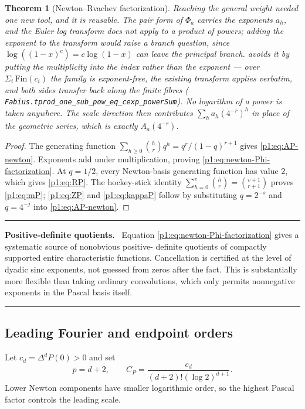 \documentclass[11pt,oneside]{article}
\numberwithin{equation}{section}
\newtheorem{theorem}{Theorem}[section]
\theoremstyle{definition}
\theoremstyle{remark}
\newcommand{\lean}[1]{%
  \ifmmode\text{\texttt{\detokenize{#1}}}\else\nolinkurl{#1}\fi}
\newenvironment{resultbox}[1]{%
  \par\medskip\noindent\begin{center}\begin{minipage}{0.94\textwidth}%
  \color{deepgreen}\hrule\vspace{0.65em}%
  \color{black}\textbf{\color{deepgreen}#1.}\ }{%
  \par\vspace{0.65em}\color{deepgreen}\hrule
  \end{minipage}\end{center}\medskip}
\begin{document}
\begin{theorem}[Newton--Rvachev factorization]
Reaching the general weight needed one new tool, and it is reusable.  The pair form of $\Phi_a$
carries the exponents $a_h$, and the Euler log transform does not apply to a product of powers;
adding the exponent to the transform would raise a branch question, since
$\log((1-x)^c)=c\log(1-x)$ can leave the principal branch.  
avoids it by putting the multiplicity into the \emph{index} rather than the exponent --- over
$\Sigma_i\,\mathrm{Fin}(c_i)$ the family is exponent-free, the existing transform applies
verbatim, and both sides transfer back along the finite fibres
(\lean{Fabius.tprod\_one\_sub\_pow\_eq\_cexp\_powerSum}).  No logarithm of a power is taken
anywhere.  The scale direction then contributes $\sum_h a_h(4^{-r})^h$ in place of the geometric
series, which is exactly $A_a(4^{-r})$.
\end{theorem}

\begin{proof}
The generating function
$\sum_{h\ge0}\binom hrq^h=q^r/(1-q)^{r+1}$ gives
\eqref{p1:eq:AP-newton}.  Exponents add under multiplication, proving
\eqref{p1:eq:newton-Phi-factorization}.  At $q=1/2$, every Newton-basis generating function
has value $2$, which gives \eqref{p1:eq:RP}.  The hockey-stick identity
$\sum_{h=0}^{v}\binom hr=\binom{v+1}{r+1}$ proves \eqref{p1:eq:mP};
\eqref{p1:eq:ZP} and \eqref{p1:eq:kappaP} follow by substituting $q=2^{-s}$ and $q=4^{-j}$
into \eqref{p1:eq:AP-newton}.
\end{proof}

\begin{resultbox}{Positive-definite quotients}
Equation \eqref{p1:eq:newton-Phi-factorization} gives a systematic source of nonobvious positive-
definite quotients of compactly supported entire characteristic functions.  Cancellation is
certified at the level of dyadic sinc exponents, not guessed from zeros after the fact.  This
is substantially more flexible than taking ordinary convolutions, which only permits
nonnegative exponents in the Pascal basis itself.
\end{resultbox}

\subsection{Leading Fourier and endpoint orders}

Let $c_d=\Delta^dP(0)>0$ and set
\begin{equation}
 p=d+2,
 \qquad
 C_P=\frac{c_d}{(d+2)!(\log2)^{d+1}}.
 \label{p1:eq:CP}
\end{equation}
Lower Newton components have smaller logarithmic order, so the highest Pascal factor controls
the leading scale.
\end{document}
